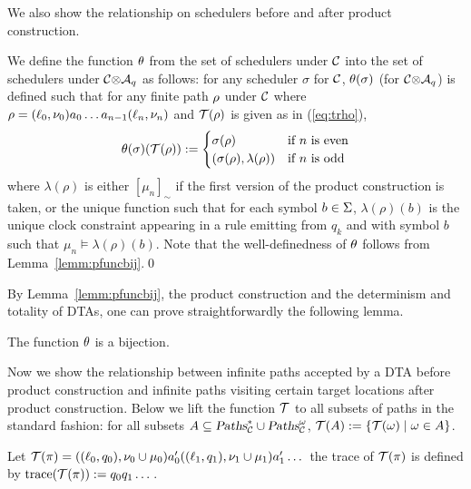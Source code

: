 
We also show the relationship on schedulers before and after product construction.

We define the function $\theta$ from the set of schedulers under $\mathcal{C}$ into the set of schedulers under ${\mathcal{C}}{\otimes}{\mathcal{A}_q}$ as follows: for any scheduler $\sigma$ for $\mathcal{C}$, $\theta(\sigma)$ (for ${\mathcal{C}}{\otimes}{\mathcal{A}_q}$) is defined such that for any finite path $\rho$ under $\mathcal{C}$ where $\rho=(\ell_0,\nu_0)a_0\dots a_{n-1}(\ell_n,\nu_n)$ and $\mathcal{T}(\rho)$ is given as in (\ref{eq:trho}),
\[
\theta(\sigma)(\mathcal{T}(\rho)):=
\begin{cases}
\sigma(\rho) & \mbox{if }n\mbox{ is even} \\
(\sigma(\rho),\lambda(\rho)) & \mbox{if }n\mbox{ is odd}
\end{cases}
\]
where $\lambda(\rho)$ is either $\left[\mu_n\right]_\sim$ if the first version of the product construction is taken, or
the unique function such that for each symbol $b\in\Sigma$, $\lambda(\rho)(b)$ is the unique clock constraint appearing in a rule emitting from $q_k$ and with symbol $b$ such that $\mu_n\models\lambda(\rho)(b)$.
Note that the well-definedness of $\theta$ follows from Lemma~\ref{lemm:pfuncbij}.\qed

By Lemma~\ref{lemm:pfuncbij}, the product construction and the determinism and totality of DTAs, one can prove straightforwardly the following lemma.
\vspace{-0.8em}
\begin{lemma}\label{lemm:sfuncbij}
The function $\theta$ is a bijection.
\end{lemma}
\vspace{-0.8em}
Now we show the relationship between infinite paths accepted by a DTA before product construction and infinite paths visiting certain target locations after product construction.
Below we lift the function $\mathcal{T}$ to all subsets of paths in the standard fashion: for all subsets $A\subseteq \mbox{\sl Paths}^*_{\mathcal{C}}\cup\mbox{\sl Paths}^\omega_{\mathcal{C}}$, $\mathcal{T}(A):=\{\mathcal{T}(\omega)\mid \omega\in A\}$.

\vspace{-0.8em}
\begin{definition}[Traces]
Let 
$ \mathcal{T}(\pi) = 
    ((\ell_0,q_0),\nu_0\cup\mu_0)
    a'_0
    ((\ell_1,q_1),\nu_1\cup\mu_1)
    a'_1
    \dots 
$
the trace of $ \mathcal{T} ( \pi ) $ is defined by
$\mbox{trace}(  \mathcal{T} ( \pi )  ) := q_0 q_1 \dots $.
\end{definition}

